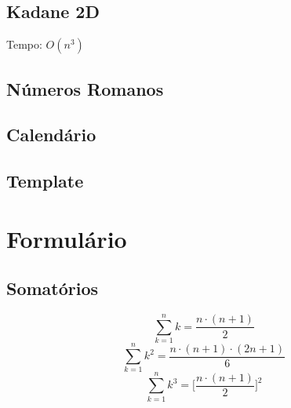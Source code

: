 \documentclass[12pt,a4paper]{article}
\begin{document}
		\subsection{Kadane 2D}
			Tempo: \(O(n^3)\)
		\subsection{Números Romanos}
			
		\subsection{Calendário}
			
		\subsection{Template}
			

	\twocolumn
	\section{Formulário}
		\subsection{Somatórios}
			\[ \sum_{k = 1}^{n} k = \frac{n \cdot (n + 1)}{2} \]
			\[ \sum_{k = 1}^{n} k^2 = \frac{n \cdot (n + 1) \cdot (2n + 1)}{6} \]
			\[ \sum_{k = 1}^{n} k^3 = \bigg[\frac{n \cdot (n + 1)}{2}\bigg]^2 \]
\end{document}
